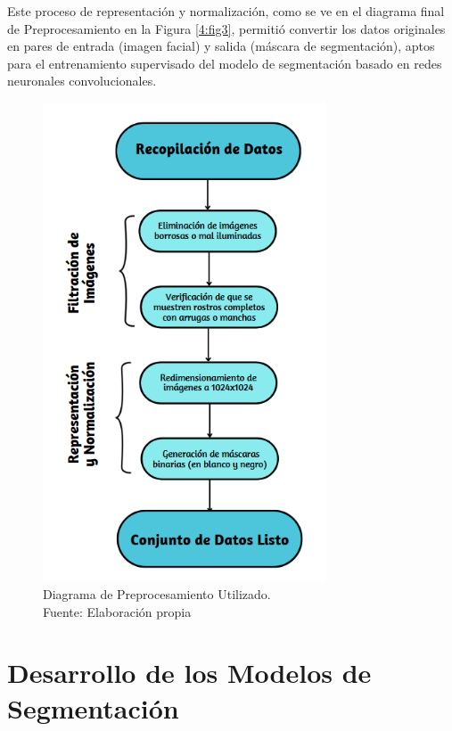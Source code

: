 Este proceso de representación y normalización, como se ve en el diagrama final de Preprocesamiento en la Figura \ref{4:fig3}, permitió convertir los datos originales en pares de entrada (imagen facial) y salida (máscara de segmentación), aptos para el entrenamiento supervisado del modelo de segmentación basado en redes neuronales convolucionales.

\begin{figure}[h]
	\begin{center}
		\includegraphics[width=0.75\textwidth]{4/figures/diagrama final prepo.png}
		\caption[Diagrama de Preprocesamiento Utilizado]{Diagrama de Preprocesamiento Utilizado.\\
		Fuente: Elaboración propia}
		\label{4:fig2}
	\end{center}
\end{figure}

\section{Desarrollo de los Modelos de Segmentación}

